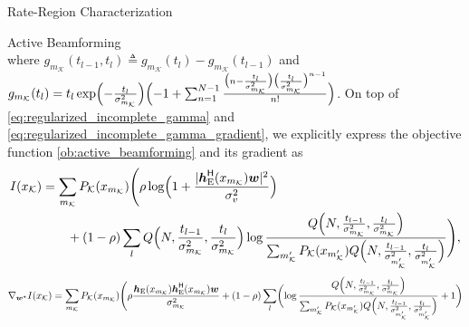 \documentclass[journal,12pt,onecolumn,draftclsnofoot]{IEEEtran}
\theoremstyle{remark}
\begin{document}
\begin{section}{Rate-Region Characterization}
\begin{subsection}{Active Beamforming}
\begin{equation}
			\label{eq:regularized_incomplete_gamma_gradient}
		\end{equation}
		where $g_{m_{\mathcal{K}}}(t_{l-1},t_l) \triangleq g_{m_{\mathcal{K}}}(t_l)-g_{m_{\mathcal{K}}}(t_{l-1})$ and $g_{m_{\mathcal{K}}}(t_l) = t_l\exp\Bigl(-\frac{t_l}{\sigma_{m_{\mathcal{K}}}^2}\Bigr)\Bigl(-1+\sum_{n=1}^{N-1} \frac{\bigl(n - \frac{t_l}{\sigma_{m_{\mathcal{K}}}^2}\bigr) \bigl(\frac{t_l}{\sigma_{m_{\mathcal{K}}}^2}\bigr)^{n-1}}{n!}\Bigr)$.
		On top of \eqref{eq:regularized_incomplete_gamma} and \eqref{eq:regularized_incomplete_gamma_gradient}, we explicitly express the objective function \eqref{ob:active_beamforming} and its gradient as
		\begin{align}
			I(x_{\mathcal{K}})
			 & =\sum_{m_{\mathcal{K}}}P_{\mathcal{K}}(x_{m_{\mathcal{K}}})\Biggl(\rho\log\Bigl(1+\frac{\lvert\boldsymbol{h}_{\text{E}}^\mathsf{H}(x_{m_{\mathcal{K}}})\boldsymbol{w}\rvert^2}{\sigma_v^2}\Bigr) \nonumber                                                                                                                                                                                                      \\
			 & \qquad + (1-\rho)\sum_l Q\Bigl(N,\frac{t_{l-1}}{\sigma_{m_{\mathcal{K}}}^2},\frac{t_l}{\sigma_{m_{\mathcal{K}}}^2}\Bigr) \log \frac{Q\Bigl(N,\frac{t_{l-1}}{\sigma_{m_{\mathcal{K}}}^2},\frac{t_l}{\sigma_{m_{\mathcal{K}}}^2}\Bigr)}{\sum_{m_{\mathcal{K}}'} P_{\mathcal{K}}(x_{m_{\mathcal{K}}'}) Q\Bigl(N,\frac{t_{l-1}}{\sigma_{m_{\mathcal{K}}'}^2},\frac{t_l}{\sigma_{m_{\mathcal{K}}'}^2}\Bigr)}\Biggr),
			\label{eq:weighted_sum_mutual_information_explicit}
		\end{align}
		\begin{align}
			\nabla_{\boldsymbol{w}^*} I(x_{\mathcal{K}})
			 & = \sum_{m_{\mathcal{K}}}P_{\mathcal{K}}(x_{m_{\mathcal{K}}})\Biggl(\rho\frac{\boldsymbol{h}_{\text{E}}(x_{m_{\mathcal{K}}})\boldsymbol{h}_{\text{E}}^\mathsf{H}(x_{m_{\mathcal{K}}})\boldsymbol{w}}{\sigma_{m_{\mathcal{K}}}^2}+(1-\rho)\sum_l\biggl(\log\frac{Q\Bigl(N,\frac{t_{l-1}}{\sigma_{m_{\mathcal{K}}}^2},\frac{t_l}{\sigma_{m_{\mathcal{K}}}^2}\Bigr)}{\sum_{m_{\mathcal{K}}'}P_{\mathcal{K}}(x_{m_{\mathcal{K}}'})Q\Bigl(N,\frac{t_{l-1}}{\sigma_{m_{\mathcal{K}}'}^2},\frac{t_l}{\sigma_{m_{\mathcal{K}}'}^2}\Bigr)}+1\biggr)\nonumber                                                              \\

\end{align}
\end{subsection}
\end{section}
\end{document}
